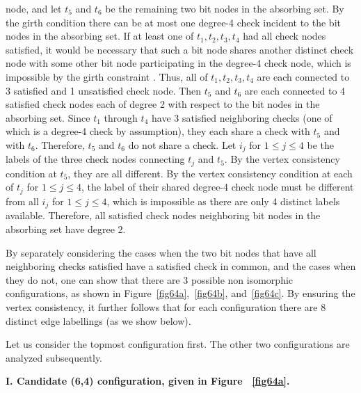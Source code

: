 node, and let $t_5$ and $t_6$ be the remaining two bit nodes in
the absorbing set. By the girth condition there can be at most one
degree-4 check incident to the bit nodes in the absorbing set. If
at least one of $t_1, t_2,t_3,t_4$ had all check nodes satisfied,
it would be necessary that such a bit node shares another distinct
check node with some other bit node participating in the degree-4
check node, which is impossible by the girth constraint
\cite{fan}. Thus, all of $t_1, t_2,t_3,t_4$ are each connected to
3 satisfied and 1 unsatisfied check node. Then $t_5$ and $t_6$ are
each connected to 4 satisfied check nodes each of degree 2 with
respect to the bit nodes in the absorbing set. Since $t_1$ through
$t_4$ have 3 satisfied neighboring checks (one of which is a
degree-4 check by assumption), they each share a check with $t_5$
and with $t_6$. Therefore, $t_5$ and $t_6$ do not share a check.
Let $i_j$ for $1 \leq j \leq 4$ be the labels of the three check
nodes connecting $t_j$ and $t_5$. By the vertex consistency
condition at $t_5$, they are all different. By the vertex
consistency condition at each of $t_j$ for $1 \leq j \leq 4$, the
label of their shared degree-4 check node must be different from
all $i_j$ for $1 \leq j \leq 4$, which is impossible as there are
only 4 distinct labels available. Therefore, all satisfied check
nodes neighboring bit nodes in the absorbing set have degree 2.


By separately considering the cases when the two bit nodes that
have all neighboring checks satisfied have a satisfied check in
common, and the cases when they do not, one can show that there
are 3 possible non isomorphic configurations, as shown in
Figure~\ref{fig64a},~\ref{fig64b}, and~\ref{fig64c}. By ensuring
the vertex consistency, it further follows that for each
configuration there are 8 distinct edge labellings (as we show
below).

Let us consider the topmost configuration first. The other two
configurations are analyzed subsequently.

\textbf{I. Candidate (6,4) configuration, given in Figure
~\ref{fig64a}.}

